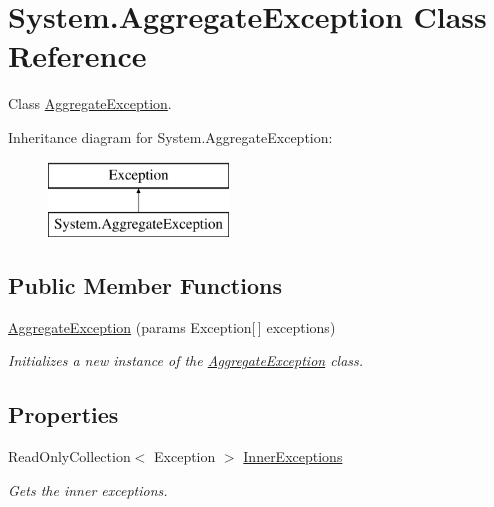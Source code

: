 \hypertarget{class_system_1_1_aggregate_exception}{}\section{System.\+Aggregate\+Exception Class Reference}
\label{class_system_1_1_aggregate_exception}


Class \hyperlink{class_system_1_1_aggregate_exception}{Aggregate\+Exception}.  


Inheritance diagram for System.\+Aggregate\+Exception\+:\begin{figure}[H]
\begin{center}
\leavevmode
\includegraphics[height=2.000000cm]{class_system_1_1_aggregate_exception}
\end{center}
\end{figure}
\subsection*{Public Member Functions}
\begin{DoxyCompactItemize}
\item 
\hyperlink{class_system_1_1_aggregate_exception_a892fba5f00deea7485d2f74ce0784129}{Aggregate\+Exception} (params Exception\mbox{[}$\,$\mbox{]} exceptions)
\begin{DoxyCompactList}\small\item\em Initializes a new instance of the \hyperlink{class_system_1_1_aggregate_exception}{Aggregate\+Exception} class. \end{DoxyCompactList}\end{DoxyCompactItemize}
\subsection*{Properties}
\begin{DoxyCompactItemize}
\item 
Read\+Only\+Collection$<$ Exception $>$ \hyperlink{class_system_1_1_aggregate_exception_a295c129a5f0ee297d339315d90ea2860}{Inner\+Exceptions}
\begin{DoxyCompactList}\small\item\em Gets the inner exceptions. \end{DoxyCompactList}\end{DoxyCompactItemize}


